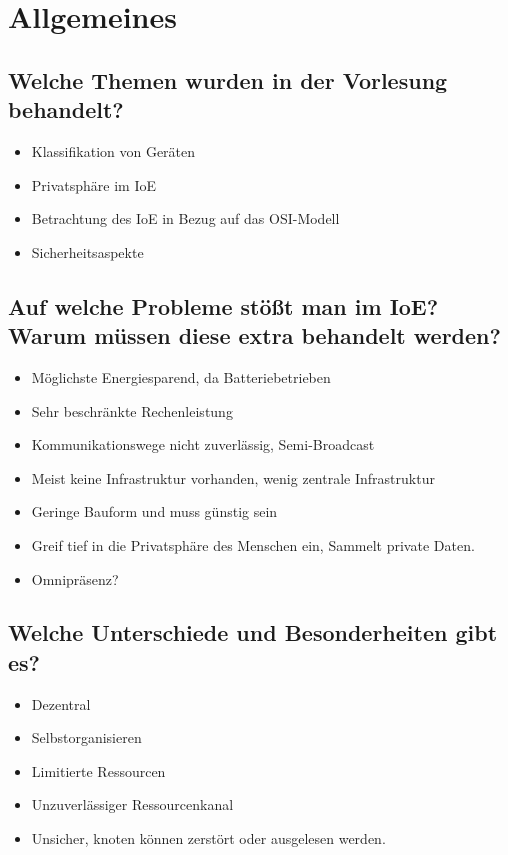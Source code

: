 \section{Allgemeines}
	\subsection{Welche Themen wurden in der Vorlesung behandelt?}
		\begin{itemize}
			\item Klassifikation von Geräten
			\item Privatsphäre im IoE
			\item Betrachtung des IoE in Bezug auf das OSI-Modell
			\item Sicherheitsaspekte
		\end{itemize}
	
	\subsection{Auf welche Probleme stößt man im IoE? Warum müssen diese extra behandelt werden?}
		\begin{itemize}
			\item Möglichste Energiesparend, da Batteriebetrieben
			\item Sehr beschränkte Rechenleistung
			\item Kommunikationswege nicht zuverlässig, Semi-Broadcast
			\item Meist keine Infrastruktur vorhanden, wenig zentrale Infrastruktur
			\item Geringe Bauform und muss günstig sein
			\item Greif tief in die Privatsphäre des Menschen ein, Sammelt private Daten.
			\item Omnipräsenz?
		\end{itemize}
		
	\subsection{Welche Unterschiede und Besonderheiten gibt es?}
		\begin{itemize}
			\item Dezentral
			\item Selbstorganisieren
			\item Limitierte Ressourcen
			\item Unzuverlässiger Ressourcenkanal
			\item Unsicher, knoten können zerstört oder ausgelesen werden.
		\end{itemize}
		
